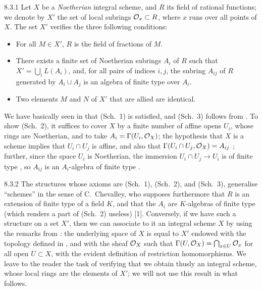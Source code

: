 
\begin{env}{8.3.1}
Let $X$ be a \emph{Noetherian} integral scheme, and $R$ its
field of rational functions; we denote by $X'$ the set of local subrings
$\mathcal{O}_x\subset R$, where $x$ runs over all points of $X$. The set $X'$ verifies
the three following conditions:
\begin{itemize}
  \item[(Sch. 1)] For all $M\in X'$, $R$ is the field of fractions of $M$.
  \item[(Sch. 2)] There exists a finite set of Noetherian subrings $A_i$ of $R$
  such that $X'=\bigcup_i L(A_i)$, and, for all pairs of indices $i,j$, the subring
  $A_{ij}$ of $R$ generated by $A_i\cup A_j$ is an algebra of finite type over $A_i$.
  \item[(Sch. 3)] Two elements $M$ and $N$ of $X'$ that are allied are identical.
\end{itemize}
\end{env}

We have basically seen in  that (Sch.~1) is satisfied, and (Sch.~3)
follows from . To show (Sch.~2), it suffices to cover $X$ by a
finite number of affine opens $U_i$, whose rings are Noetherian, and to take
$A_i=\Gamma(U_i,\mathcal{O}_X)$; the hypothesis that $X$ is a scheme implies that
$U_i\cap U_j$ is affine, and also that $\Gamma(U_i\cap U_j,\mathcal{O}_X)=A_{ij}$
; further, since the space $U_i$ is Noetherian, the immersion
$U_i\cap U_j\to U_i$ is of finite type , so $A_{ij}$ is an
$A_i$-algebra of finite type .

\begin{env}{8.3.2} The structures whose axioms are (Sch.~1), (Sch.~2), and
(Sch.~3), generalise ``schemes'' in the sense of C.~Chevalley, who supposes
furthermore that $R$ is an extension of finite type of a field $K$, and that the
$A_i$ are $K$-algebras of finite type (which renders a part of (Sch.~2) useless)
[1]. Conversely, if we have such a structure on a set $X'$, then we can
associate to it an integral scheme $X$ by using the remarks from :
the underlying space of $X$ is equal to $X'$ endowed with the topology defined
in , and with the sheaf $\mathcal{O}_X$ such that
$\Gamma(U,\mathcal{O}_X)=\bigcap_{x\in U}\mathcal{O}_x$ for all open $U\subset X$, with the
evident definition of restriction homomorphisms. We leave to the reader the
task of verifying that we obtain thusly an integral scheme, whose local rings
are the elements of $X'$; we will not use this result in what follows.
\end{env}

